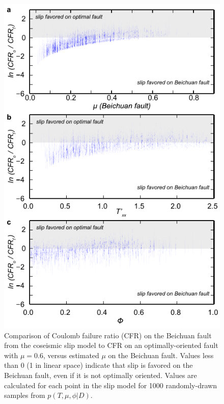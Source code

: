 \documentclass[draft,jgrga]{AGUTeX}
\begin{document}
\begin{figure}%
\centering
\includegraphics{../figures/cfr_plots.pdf}
\caption{Comparison of Coulomb failure ratio (CFR) on the Beichuan fault
from the \citet{zhang2011} coseismic slip model to CFR on an
optimally-oriented fault with $\mu = 0.6$, versus estimated $\mu$ on the
Beichuan fault. Values less than 0 (1 in linear space) indicate that
slip is favored on the Beichuan fault, even if it is not optimally
oriented. Values are calculated for each point in the slip model for
1000 randomly-drawn samples from $p(T,\mu,\phi |D)$.}
\label{fig:cfr_ratios}
\end{figure}
\end{document}
